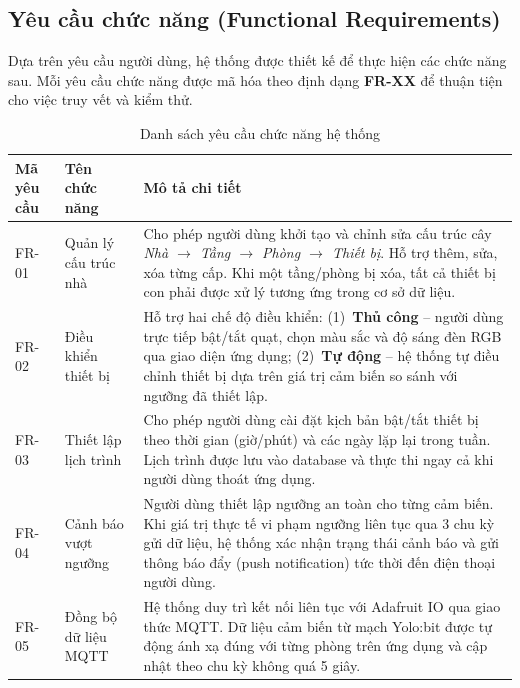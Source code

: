\subsection{Yêu cầu chức năng (Functional Requirements)}

Dựa trên yêu cầu người dùng, hệ thống được thiết kế để thực hiện các chức năng sau. Mỗi yêu cầu chức năng được mã hóa theo định dạng \textbf{FR-XX} để thuận tiện cho việc truy vết và kiểm thử.

\begin{table}[H]
\centering
\caption{Danh sách yêu cầu chức năng hệ thống}
\renewcommand{\arraystretch}{1.4}
\begin{tabular}{|m{2.2cm}|m{4cm}|m{7.5cm}|}
\hline
\textbf{Mã yêu cầu} & \textbf{Tên chức năng} & \textbf{Mô tả chi tiết} \\ \hline

FR-01 & Quản lý cấu trúc nhà & Cho phép người dùng khởi tạo và chỉnh sửa cấu trúc cây \textit{Nhà $\rightarrow$ Tầng $\rightarrow$ Phòng $\rightarrow$ Thiết bị}. Hỗ trợ thêm, sửa, xóa từng cấp. Khi một tầng/phòng bị xóa, tất cả thiết bị con phải được xử lý tương ứng trong cơ sở dữ liệu. \\ \hline

FR-02 & Điều khiển thiết bị & Hỗ trợ hai chế độ điều khiển: (1)~\textbf{Thủ công} -- người dùng trực tiếp bật/tắt quạt, chọn màu sắc và độ sáng đèn RGB qua giao diện ứng dụng; (2)~\textbf{Tự động} -- hệ thống tự điều chỉnh thiết bị dựa trên giá trị cảm biến so sánh với ngưỡng đã thiết lập. \\ \hline

FR-03 & Thiết lập lịch trình & Cho phép người dùng cài đặt kịch bản bật/tắt thiết bị theo thời gian (giờ/phút) và các ngày lặp lại trong tuần. Lịch trình được lưu vào database và thực thi ngay cả khi người dùng thoát ứng dụng. \\ \hline

FR-04 & Cảnh báo vượt ngưỡng & Người dùng thiết lập ngưỡng an toàn cho từng cảm biến. Khi giá trị thực tế vi phạm ngưỡng liên tục qua 3 chu kỳ gửi dữ liệu, hệ thống xác nhận trạng thái cảnh báo và gửi thông báo đẩy (push notification) tức thời đến điện thoại người dùng. \\ \hline

FR-05 & Đồng bộ dữ liệu MQTT & Hệ thống duy trì kết nối liên tục với Adafruit IO qua giao thức MQTT. Dữ liệu cảm biến từ mạch Yolo:bit được tự động ánh xạ đúng với từng phòng trên ứng dụng và cập nhật theo chu kỳ không quá 5 giây. \\ \hline


\end{tabular}
\end{table}
